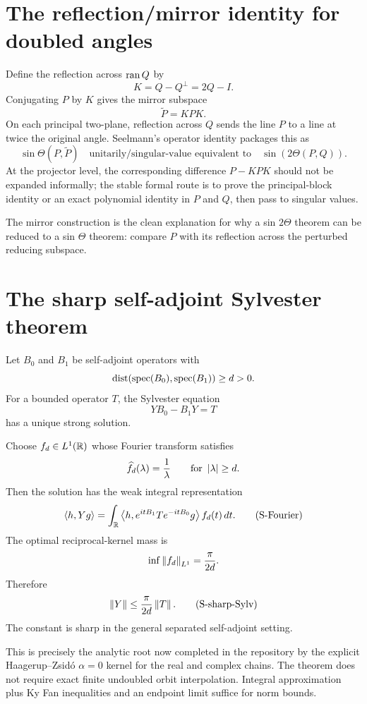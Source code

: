 \section{The reflection/mirror identity for doubled angles}

Define the reflection across $\operatorname{ran} Q$ by
\[
 K=Q-Q^\perp=2Q-I.
\]
Conjugating $P$ by $K$ gives the mirror subspace
\[
 \widetilde P=KPK.
\]
On each principal two-plane, reflection across $Q$ sends the line $P$ to a line at twice the original angle. Seelmann's operator identity packages this as
\[
 \sin\Theta(P,\widetilde P)
 \quad\text{unitarily/singular-value equivalent to}\quad
 \sin(2\Theta(P,Q)).
\]
At the projector level, the corresponding difference $P-KPK$ should not be expanded informally; the stable formal route is to prove the principal-block identity or an exact polynomial identity in $P$ and $Q$, then pass to singular values.

The mirror construction is the clean explanation for why a sin $2\Theta$ theorem can be reduced to a sin $\Theta$ theorem: compare $P$ with its reflection across the perturbed reducing subspace.

\section{The sharp self-adjoint Sylvester theorem}

Let $B_0$ and $B_1$ be self-adjoint operators with
\[
 \operatorname{dist}(\operatorname{spec}(B_0),\operatorname{spec}(B_1))\ge d>0.
\]
For a bounded operator $T$, the Sylvester equation
\begin{equation}
 YB_0-B_1Y=T
 \tag{S-Sylv}
\end{equation}
has a unique strong solution.

Choose $f_d\in L^1(\mathbb{R})$ whose Fourier transform satisfies
\[
 \widehat f_d(\lambda)=\frac1\lambda
 \qquad\text{for }\left\lvert \lambda\right\rvert\ge d.
\]
Then the solution has the weak integral representation
\begin{equation}
 \left\langle h,Yg\right\rangle
 =
 \int_{\mathbb{R}}
 \left\langle h,e^{itB_1}Te^{-itB_0}g\right\rangle
 f_d(t)\,dt.
 \tag{S-Fourier}
\end{equation}
The optimal reciprocal-kernel mass is
\[
 \inf\left\lVert f_d\right\rVert_{L^1}=\frac{\pi}{2d}.
\]
Therefore
\begin{equation}
 \left\lVert Y\right\rVert
 \le
 \frac{\pi}{2d}\left\lVert T\right\rVert.
 \tag{S-sharp-Sylv}
\end{equation}
The constant is sharp in the general separated self-adjoint setting.

This is precisely the analytic root now completed in the repository by the explicit Haagerup--Zsid\'o $\alpha=0$ kernel for the real and complex chains. The theorem does not require exact finite undoubled orbit interpolation. Integral approximation plus Ky Fan inequalities and an endpoint limit suffice for norm bounds.

